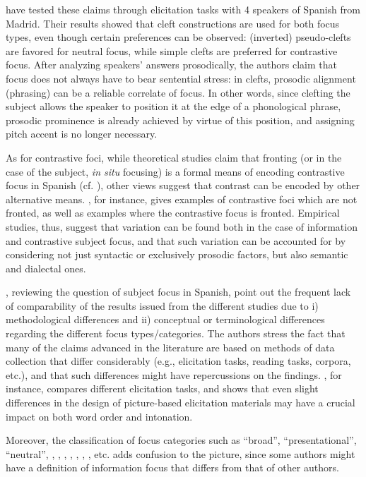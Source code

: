 \textcite{feldhausen2015oraciones} have tested these claims through elicitation tasks with 4 speakers of Spanish from Madrid. Their results showed that cleft constructions are used for both focus types, even though certain preferences can be observed: (inverted) pseudo-clefts are favored for neutral focus, while simple clefts are preferred for contrastive focus. After analyzing speakers’ answers prosodically, the authors claim that focus does not always have to bear sentential stress: in clefts, prosodic alignment (phrasing) can be a reliable correlate of focus. In other words, since clefting the subject allows the speaker to position it at the edge of a phonological phrase, prosodic prominence is already achieved by virtue of this position, and assigning pitch accent is no longer necessary.

As for contrastive foci, while theoretical studies claim that fronting (or in the case of the subject, \textit{in situ }focusing) is a formal means of encoding contrastive focus in Spanish (cf. \cite{zubizarreta1998prosody}), other views suggest that contrast can be encoded by other alternative means. \textcite{brunetti2009italian}, for instance, gives  examples  of  contrastive  foci  which  are  not fronted, as well as examples where the contrastive focus is fronted. 
Empirical studies, thus, suggest that variation can be found both in the case of information and contrastive subject focus, and that such variation can be accounted for by considering not just syntactic or exclusively prosodic factors, but also semantic and dialectal ones.

\textcite{garcia2018introduction}, reviewing the question of subject focus in Spanish, point out the frequent lack of comparability of the results issued from the different studies due to i) methodological differences and ii) conceptual or terminological differences regarding the different focus types/categories. The authors stress the fact that many of the claims advanced in the literature are based on methods of data collection that differ considerably (e.g., elicitation tasks, reading tasks, corpora, etc.), and that such differences might have repercussions on the findings.
\textcite{uth2014spanish}, for instance, compares different elicitation tasks, and shows that even slight differences in the design of picture-based elicitation materials may have a crucial impact on both word order and intonation.

Moreover, the classification of focus categories such as ``broad”, ``presentational”, ``neutral”, , , , , , , , etc. adds confusion to the picture, since some authors might have a definition of information focus that differs from that of other authors.


